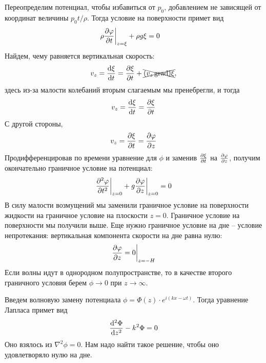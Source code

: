 Переопределим потенциал, чтобы избавиться от $p_0$, добавлением не зависящей от координат величины $p_0t/\rho$. Тогда условие на поверхности примет вид
\begin{equation}
	\rho\pdv{\varphi}{t}\bigg|_{z=\xi}+\rho g\xi=0 \quad 
\end{equation}
Найдем, чему равняется вертикальная скорость:
\begin{equation}
	v_z=\dv{\xi}{t}=\pdv{\xi}{t}+\xcancel{(v_z\operatorname{grad})\xi},
\end{equation}
здесь из-за малости колебаний вторым слагаемым мы пренебрегли,  и тогда
\begin{equation}
	v_z=\dv{\xi}{t}=\pdv{\xi}{t}
\end{equation}
С другой стороны, 
\begin{equation}
	v_z=\pdv{\xi}{t}=\pdv{\varphi}{z}
\end{equation}
Продифференцировав по времени уравнение для $\phi$ и заменив $\pdv{\xi}{t}$ на $\pdv{\varphi}{z}$, получим окончательно граничное условие  на потенциал:
\begin{equation}
	\pdv[2]{\varphi}{t}\bigg|_{z=0}+g\pdv{\varphi}{z}\bigg|_{z=0}=0
\end{equation}
В силу малости возмущений мы заменили граничное условие на поверхности жидкости на граничное условие на плоскости $z=0$. Граничное условие на поверхности мы получили выше. Еще нужно граничное условие на дне -- условие непротекания: вертикальная компонента скорости на дне равна нулю:
\begin{equation}
	\pdv{\varphi}{z}=0 \bigg|_{z=-H}
\end{equation}
Если волны идут в однородном полупространстве, то в качестве второго
граничного условия берем $\phi \to 0$ при $z\to\infty$.

Введем волновую замену потенциала $\phi=\Phi(z)\cdot e^{i(kx- \omega t)}$. Тогда уравнение Лапласа примет вид
\begin{equation}
	\dv[2]{\Phi}{z}-k^2\Phi=0
\end{equation}
Оно взялось из $\nabla^2\phi=0$. Нам надо найти такое решение, чтобы оно удовлетворяло нулю на дне. 

